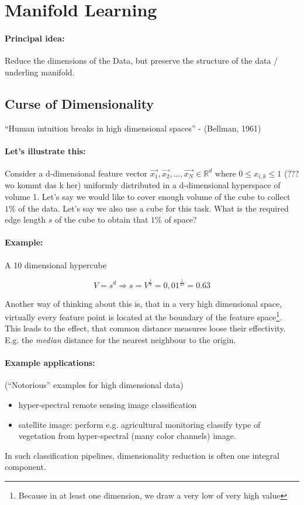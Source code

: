 
\section*{Manifold Learning}
\paragraph{Principal idea:} Reduce the dimensions of the Data, but preserve the structure of the data / underling manifold.

\subsection*{Curse of Dimensionality}
``Human intuition breaks in high dimensional spaces'' - (Bellman, 1961)

\paragraph{Let's illustrate this:}
Consider a d-dimensional feature vector $\vec{x_1}, \vec{x_2}, \dots, \vec{x_N} \in \mathbb{R}^d$ where $0 \le x_{i,k} \le 1$ (??? wo kommt das k her) uniformly distributed in a d-dimensional hyperspace of volume 1.
Let's say we would like to cover enough volume of  the cube to collect $1\%$ of the data. Let's say we also use a cube for this task. What is the required edge length $s$ of the cube to obtain that $1\%$ of space?

\paragraph{Example:}
A 10 dimensional hypercube

\begin{equation*}
    V=s^d \Rightarrow s = V^{\frac{1}{d}} = 0,01^{\frac{1}{10}} = 0.63
\end{equation*}

Another way of thinking about this is, that in a very high dimensional space, virtually every feature point is located at the boundary of the feature space\footnote{Because in at least one dimension, we draw a very low of very high value}. This leads to the effect, that common distance measures loose their  effectivity. E.g. the \textit{median} distance for the nearest neighbour to the origin.

\paragraph{Example applications:}
(``Notorious'' examples for high dimensional data)

\begin{itemize}
    \item hyper-spectral remote sensing image classification
    \item satellite image:  perform e.g. agricultural monitoring classify type of vegetation from hyper-spectral (many color channels) image.
\end{itemize}

In such classification pipelines, dimensionality reduction is often one integral component.
